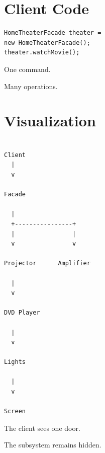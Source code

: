 \documentclass[11pt,a4paper]{book}
\begin{document}

\section{Client Code}

\begin{verbatim}
HomeTheaterFacade theater =
new HomeTheaterFacade();
theater.watchMovie();
\end{verbatim}


One command.


Many operations.


\section{Visualization}

\begin{verbatim}

Client
  |
  v

Facade

  |
  +----------------+
  |                |
  v                v

Projector      Amplifier

  |
  v

DVD Player

  |
  v

Lights

  |
  v

Screen

\end{verbatim}


The client sees one door.


The subsystem remains hidden.

\end{document}
